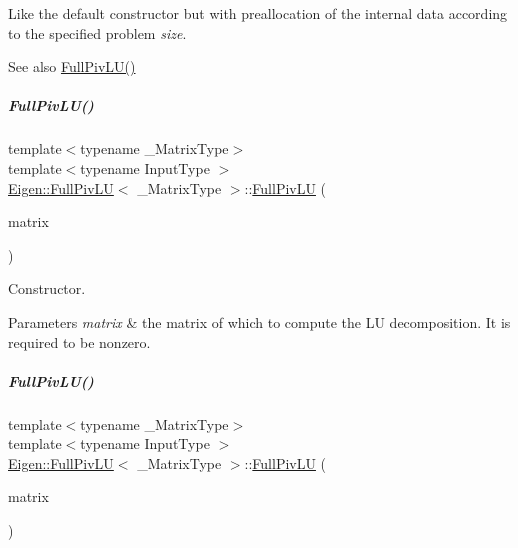 Like the default constructor but with preallocation of the internal data according to the specified problem {\itshape size}. \begin{DoxySeeAlso}{See also}
\hyperlink{group___l_u___module_af225528d1c6e623a2b1dce091907d13e}{Full\+Piv\+L\+U()} 
\end{DoxySeeAlso}
\mbox{\label{group___l_u___module_a470c7997b565f43791f484e869f04908}} 
\subparagraph{\texorpdfstring{Full\+Piv\+L\+U()}{FullPivLU()}\hspace{0.1cm}{\footnotesize\ttfamily [7/8]}}
{\footnotesize\ttfamily template$<$typename \+\_\+\+Matrix\+Type$>$ \\
template$<$typename Input\+Type $>$ \\
\hyperlink{group___l_u___module_class_eigen_1_1_full_piv_l_u}{Eigen\+::\+Full\+Piv\+LU}$<$ \+\_\+\+Matrix\+Type $>$\+::\hyperlink{group___l_u___module_class_eigen_1_1_full_piv_l_u}{Full\+Piv\+LU} (\begin{DoxyParamCaption}\item[{const \hyperlink{group___core___module_struct_eigen_1_1_eigen_base}{Eigen\+Base}$<$ Input\+Type $>$ \&}]{matrix }\end{DoxyParamCaption})\hspace{0.3cm}{\ttfamily [explicit]}}

Constructor.


\begin{DoxyParams}{Parameters}
{\em matrix} & the matrix of which to compute the LU decomposition. It is required to be nonzero. \\
\hline
\end{DoxyParams}
\mbox{\label{group___l_u___module_a31b167b0fd06c35ab53af27b4a05c065}} 
\subparagraph{\texorpdfstring{Full\+Piv\+L\+U()}{FullPivLU()}\hspace{0.1cm}{\footnotesize\ttfamily [8/8]}}
{\footnotesize\ttfamily template$<$typename \+\_\+\+Matrix\+Type$>$ \\
template$<$typename Input\+Type $>$ \\
\hyperlink{group___l_u___module_class_eigen_1_1_full_piv_l_u}{Eigen\+::\+Full\+Piv\+LU}$<$ \+\_\+\+Matrix\+Type $>$\+::\hyperlink{group___l_u___module_class_eigen_1_1_full_piv_l_u}{Full\+Piv\+LU} (\begin{DoxyParamCaption}\item[{\hyperlink{group___core___module_struct_eigen_1_1_eigen_base}{Eigen\+Base}$<$ Input\+Type $>$ \&}]{matrix }\end{DoxyParamCaption})\hspace{0.3cm}{\ttfamily [explicit]}}



